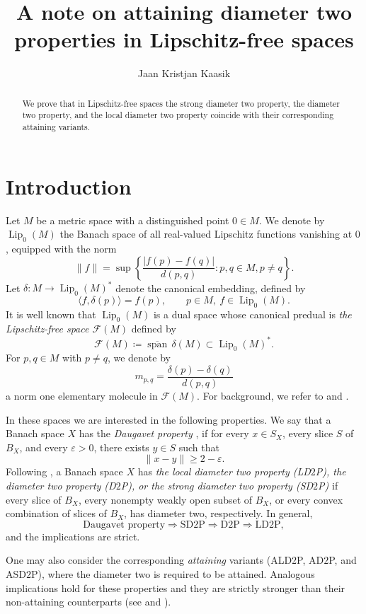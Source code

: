 \documentclass[a4paper,12pt]{amsart}
\title[Attaining diameter two properties in Lipschitz-free spaces]{A note on attaining diameter two properties in Lipschitz-free spaces}
\author{Jaan Kristjan Kaasik}
\date{}
\theoremstyle{plain}
\theoremstyle{definition}
\theoremstyle{remark}
\numberwithin{equation}{section}
\DeclareMathOperator{\Lip}{Lip}
\begin{document}
\begin{abstract}
We prove that in Lipschitz-free spaces the strong diameter two property, the diameter two property, and the local diameter two property coincide with their corresponding attaining variants.
\end{abstract}

\maketitle
\section{Introduction}

Let $M$ be a metric space with a distinguished point $0\in M$. We denote by $\Lip_0(M)$ the Banach space of all real-valued Lipschitz functions vanishing at $0$, equipped with the norm
\[
\|f\|=\sup\left\{\frac{|f(p)-f(q)|}{d(p,q)}\colon p,q\in M, p\neq q\right\}.
\]
Let $\delta:M\rightarrow \Lip_0(M)^*$ denote the canonical embedding, defined by 
\[
    \langle f, \delta(p)\rangle=f(p),
\qquad p\in M,\ f\in \Lip_0(M).\]
It is well known that $\operatorname{Lip}_0(M)$ is a dual space whose canonical predual is \emph{the Lipschitz-free space $\mathcal{F}(M)$} defined by
\[
\mathcal F(M)\coloneqq \overline{\operatorname{span}}\,\delta(M)\subset \operatorname{Lip}_0(M)^\ast.
\] 
For $p,q\in M$ with $p\neq q$, 
we denote by 
\[m_{p,q}=\frac{\delta(p)-\delta(q)}{d(p,q)}\] 
a norm one elementary molecule in $\mathcal{F}(M)$.
For background, we refer to \cite{MR2030906} and \cite{MR3792558}.

In these spaces we are interested in the following properties. We say that a Banach space $X$ has the 
\emph{Daugavet property }, if
    for every $x\in S_X$, every slice $S$ of $B_X$, and every $\varepsilon>0$, there exists $y\in S$ such that 
    \[\|x-y\|\geq 2-\varepsilon.\]
Following \cite{MR3098474}, a Banach space $X$ has \emph{the local diameter two property (LD$2$P), the diameter two property (D$2$P), or the strong diameter two property (SD$2$P)} if  every slice of $B_X$, every nonempty weakly open subset of $B_X$, or every convex combination of slices of $B_X$, has diameter two, respectively.
In general,
\[\text{Daugavet property}\Rightarrow \text{SD2P}\Rightarrow \text{D2P}\Rightarrow \text{LD2P},\] and the implications are strict.

One may also consider the corresponding \textit{attaining} variants (ALD$2$P, AD$2$P, and ASD$2$P), where the diameter two is required to be attained. Analogous implications hold for these properties and they are strictly stronger than their non-attaining counterparts (see  \cite{MR4401984} and \cite{MR4787365}).
\end{document}
